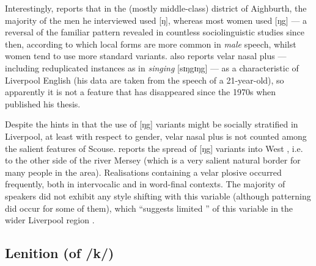 Interestingly, \citeauthor{knowles1973} reports that in the (mostly middle-class) district of Aighburth, the majority of the men he interviewed used [ŋ], whereas most women used [ŋg] \citeyearpar[cf.][295]{knowles1973} --- a reversal of the familiar pattern revealed in countless sociolinguistic studies since then, according to which local forms are more common in \emph{male} speech, whilst women tend to use more standard variants.
\citet[352]{watson2007} also reports velar nasal plus --- including reduplicated instances as in \emph{singing} [sɪŋgɪŋg] --- as a characteristic of Liverpool English (his data are taken from the speech of a 21-year-old), so apparently it is not a feature that has disappeared since the 1970s when \citeauthor{knowles1973} published his thesis.

Despite the hints in \textcite{knowles1973} that the use of [ŋg] variants might be socially stratified in Liverpool, at least with respect to gender, velar nasal plus is not counted among the salient features of Scouse.
\textcite[98]{newbrook1999} reports the spread of [ŋg] variants into West , i.e. to the other side of the river Mersey (which is a very salient natural border for many people in the area).
Realisations containing a velar plosive occurred frequently, both in intervocalic and in word-final contexts.
The majority of speakers did not exhibit any style shifting with this variable (although  patterning did occur for some of them), which ``suggests limited '' of this variable in the wider Liverpool region \parencite[98]{newbrook1999}.

		\subsection{Lenition (of /k/)}\label{sec.var.con.len}

